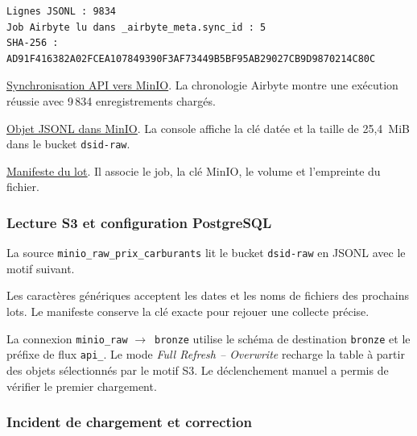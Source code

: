 \documentclass[11pt,a4paper]{article}
\newcommand{\code}[1]{\texttt{#1}}
\newcommand{\flux}{\ensuremath{\rightarrow}}
\newcommand{\preuve}[2]{%
  \href{https://github.com/MAHDIghr/projet_big_data_starter/blob/27cc8348f6737a75bb24a40d6d8cda3ae54996b3/preuves/#1}{\textcolor{encre}{\underline{#2}}}}
\newcommand{\manifeste}[2]{%
  \href{https://github.com/MAHDIghr/projet_big_data_starter/blob/27cc8348f6737a75bb24a40d6d8cda3ae54996b3/data/manifestes/#1}{\textcolor{encre}{\underline{#2}}}}
\newcommand{\afficherpowershell}{%
  \par\smallskip
  \begingroup
  \setlength{\fboxsep}{10pt}%
  \noindent\colorbox{psbar}{%
    \makebox[\dimexpr\linewidth-20pt\relax][l]{%
      \color{pstext}\small\sffamily\bfseries PowerShell
      \hfill\mdseries $-$\quad$\times$}}%
  \par\nointerlineskip
  \noindent\colorbox{psbody}{\usebox{\psoutput}}\par
  \endgroup
}
\begin{document}
\begin{lrbox}{\psoutput}
\begin{minipage}{\dimexpr\linewidth-20pt\relax}
\color{pstext}\small
\begin{Verbatim}[fontsize=\footnotesize]
Lignes JSONL : 9834
Job Airbyte lu dans _airbyte_meta.sync_id : 5
SHA-256 :
AD91F416382A02FCEA107849390F3AF73449B5BF95AB29027CB9D9870214C80C
\end{Verbatim}
\end{minipage}
\end{lrbox}
\afficherpowershell

\preuve{api/api_05_carburants_sync_minio.png}{Synchronisation API vers MinIO}. La chronologie Airbyte montre
une exécution réussie avec 9\,834 enregistrements chargés.

\preuve{api/api_06_carburants_objet_minio.png}{Objet JSONL dans MinIO}. La console affiche la clé datée
et la taille de 25,4~MiB dans le bucket \code{dsid-raw}.

\manifeste{api_prix_carburants_1794580622068_0.json}{Manifeste du lot}.
Il associe le job, la clé MinIO, le volume et l'empreinte du fichier.

\subsubsection{Lecture S3 et configuration PostgreSQL}

La source \code{minio\_raw\_prix\_carburants} lit le bucket
\code{dsid-raw} en JSONL avec le motif suivant.

\begin{quote}
\small
{}
\end{quote}

Les caractères génériques acceptent les dates et les noms de fichiers
des prochains lots. Le manifeste conserve la clé exacte pour rejouer
une collecte précise.

La connexion \code{minio\_raw} \flux\ \code{bronze} utilise le schéma
de destination \code{bronze} et le préfixe de flux \code{api\_}.
Le mode \emph{Full Refresh -- Overwrite} recharge la table à partir
des objets sélectionnés par le motif S3. Le déclenchement manuel a
permis de vérifier le premier chargement.

\subsubsection{Incident de chargement et correction}
\end{document}
